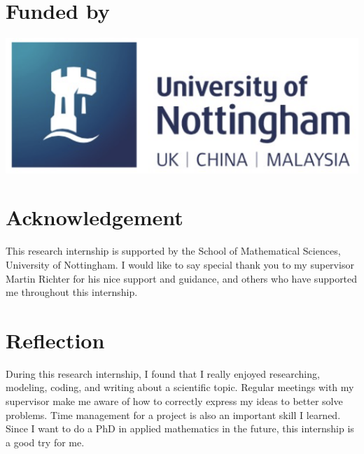 \documentclass[a0,portrait]{a0poster}
\begin{document}
\begin{multicols}{3}

\small
\nocite{*} %

\section*{Funded by}
\begin{center}\vspace{1cm}
\includegraphics[width=0.5\linewidth]{logo.png}
\end{center}%

\section*{Acknowledgement}
This research internship is supported by the School of Mathematical Sciences, University of Nottingham. I would like to say special thank you to my supervisor Martin Richter for his nice support and guidance, and others who have supported me throughout this internship.

\section*{Reflection}
During this research internship, I found that I really enjoyed researching, modeling, coding, and writing about a scientific topic. Regular meetings with my supervisor make me aware of how to correctly express my ideas to better solve problems. Time management for a project is also an important skill I learned. Since I want to do a PhD in applied mathematics in the future, this internship is a good try for me.

\end{multicols}
\end{document}
